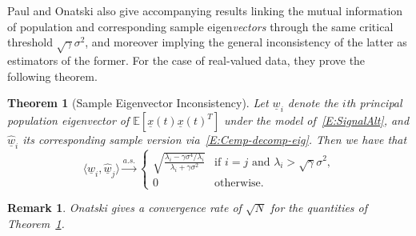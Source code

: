 \documentclass[final]{IEEEtran}
\newtheorem{theorem}{Theorem}
\newtheorem{rem}{Remark}
\newcommand{\vectorsymbol}{\underline}
\newcommand{\vw}{\vectorsymbol{w}}
\newcommand{\vhw}{\hat{\vectorsymbol{w}}}
\newcommand{\vx}{\vectorsymbol{x}}
\newcommand{\E}{\mathbb{E}}
\begin{document}
Paul and Onatski also give accompanying results linking the mutual information of population and corresponding sample eigen\emph{vectors} through the same critical threshold $\sqrt{\gamma} \sigma^2$, and moreover implying the general inconsistency of the latter as estimators of the former.  For the case of real-valued data, they prove the following theorem.

\begin{theorem}[Sample Eigenvector Inconsistency]\label{T:spiked-vector}
    Let $\vw_i$ denote the $i$th principal population eigenvector of $\E\left[ \vx(t) \vx(t)^T \right]$ under the model of~\eqref{E:SignalAlt}, and $\vhw_i$ its corresponding sample version via~\eqref{E:Cemp-decomp-eig}.  Then we have that
    \begin{equation*}
        \langle \vw_i, \vhw_j \rangle \overset{a.s.}{\longrightarrow}
        \begin{cases}
            \sqrt{\frac{\lambda_i - \gamma \sigma^4/\lambda_i}
                                   {\lambda_i + \gamma \sigma^2}} & \text{if $i = j$ and $\lambda_i > \sqrt{\gamma} \sigma^2$,} \\
            0 & \text{otherwise.}
        \end{cases}
    \end{equation*}
\end{theorem}
\begin{rem}
Onatski gives a convergence rate of $\sqrt{N}$ for the quantities of Theorem~\ref{T:spiked-vector}.
\end{rem}
\end{document}
